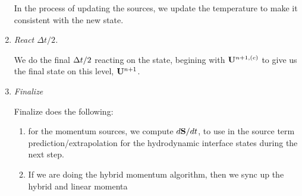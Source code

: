 \begin{enumerate}
  In the process of updating the sources, we update the temperature to
  make it consistent with the new state.






\item {\em React $\Delta t/2$.}

  We do the final $\Delta t/2$ reacting on the state, begining with ${\bf U}^{n+1,(c)}$ to
  give us the final state on this level, ${\bf U}^{n+1}$.

\item {\em Finalize}

  Finalize does the following:
  \begin{enumerate}
  \item for the momentum sources, we compute $d{\bf S}/dt$, to use in the
    source term prediction/extrapolation for the hydrodynamic
    interface states during the next step.

  \item If we are doing the hybrid momentum algorithm, then we sync up
    the hybrid and linear momenta
  \end{enumerate}

\end{enumerate}

